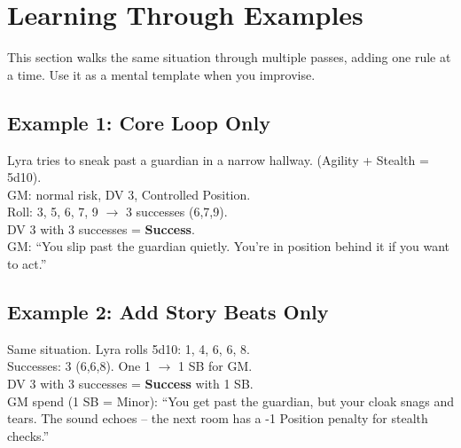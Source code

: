 \section{Learning Through Examples}
\label{sec:learning-examples}

This section walks the same situation through multiple passes, adding one rule at a time. Use it as a mental template when you improvise.

\subsection*{Example 1: Core Loop Only}
\label{subsec:ex-core-only}
\begin{tcolorbox}[colback=gray!3,colframe=gray!60,title=\textbf{Example 1 -- No SB, No Boons}, breakable]
Lyra tries to sneak past a guardian in a narrow hallway. (Agility + Stealth = 5d10).\\
GM: normal risk, DV 3, Controlled Position.\\
Roll: 3, 5, 6, 7, 9 $\rightarrow$ 3 successes (6,7,9).\\[0.3em]
DV 3 with 3 successes = \textbf{Success}.\\[0.3em]
GM: ``You slip past the guardian quietly. You're in position behind it if you want to act.''
\end{tcolorbox}

\subsection*{Example 2: Add Story Beats Only}
\label{subsec:ex-sb-only}
\begin{tcolorbox}[colback=gray!3,colframe=gray!60,title=\textbf{Example 2 -- Adding Story Beats}, breakable]
Same situation. Lyra rolls 5d10: 1, 4, 6, 6, 8.\\
Successes: 3 (6,6,8). One 1 $\rightarrow$ 1 SB for GM.\\[0.3em]
DV 3 with 3 successes = \textbf{Success} with 1 SB.\\[0.3em]
GM spend (1 SB = Minor): ``You get past the guardian, but your cloak snags and tears. The sound echoes -- the next room has a -1 Position penalty for stealth checks.''
\end{tcolorbox}

